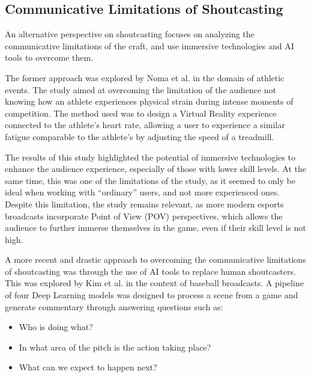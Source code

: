 \subsection{Communicative Limitations of Shoutcasting}
\label{subsec:communicative-limitations-of-shoutcasting}

An alternative perspective on shoutcasting focuses on analyzing the communicative limitations of the craft, and use immersive technologies and AI tools to overcome them. 

\medskip 

The former approach was explored by Noma et al. \cite{noma2001new} in the domain of athletic events. The study aimed at overcoming the limitation of the audience not knowing how an athlete experiences physical strain during intense moments of competition. The method used was to design a Virtual Reality experience connected to the athlete's heart rate, allowing a user to experience a similar fatigue comparable to the athlete's by adjusting the speed of a treadmill. 

\medskip

The results of this study highlighted the potential of immersive technologies to enhance the audience experience, especially of those with lower skill levels. At the same time, this was one of the limitations of the study, as it seemed to only be ideal when working with ``ordinary'' users, and not more experienced ones. Despite this limitation, the study remains relevant, as more modern esports broadcasts incorporate Point of View (POV) perspectives, which allows the audience to further immerse themselves in the game, even if their skill level is not high. 

\medskip

A more recent and drastic approach to overcoming the communicative limitations of shoutcasting was through the use of AI tools to replace human shoutcasters. This was explored by Kim et al. \cite{kim2020automatic} in the context of baseball broadcasts. A pipeline of four Deep Learning models was designed to process a scene from a game and generate commentary through answering questions such as:

\begin{itemize}
  \item Who is doing what?
  \item In what area of the pitch is the action taking place?
  \item What can we expect to happen next?
\end{itemize}


